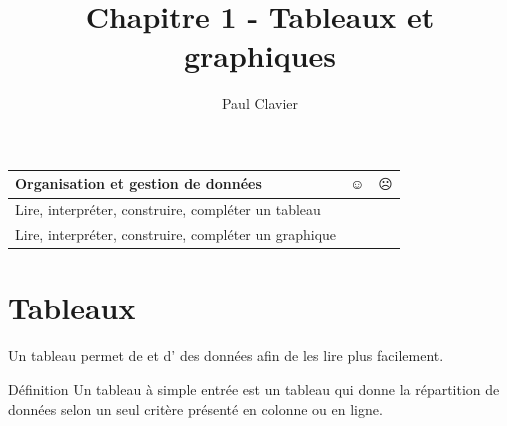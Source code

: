 \documentclass[12pt,a4paper]{article}
\author{Paul Clavier}
\title{Chapitre 1 - Tableaux et graphiques}
\begin{document}
\renewcommand\thesection{\Roman{section}}
\renewcommand\thesubsection{\arabic{subsection}}


\ifdefined\isprof
	\TeacherModeOn
\fi




\begin{center}
\end{center}

\begin{center}
\begin{tabular}{|l|c|c|}
\hline \rowcolor{lightgray}
Organisation et gestion de données \hspace{8cm} & $\smiley{}$ & $\frownie{}$\\ \hline
Lire, interpréter, construire, compléter un tableau & & \\ \hline
Lire, interpréter, construire, compléter un graphique & & \\ \hline
\end{tabular}
\end{center}

\section{Tableaux}
Un tableau permet de  et d' des données afin de les lire plus facilement.
\begin{definition}{Définition}
Un tableau à simple entrée est un tableau qui donne la répartition de données selon un seul critère présenté en colonne ou en ligne.
\end{definition}
\end{document}
